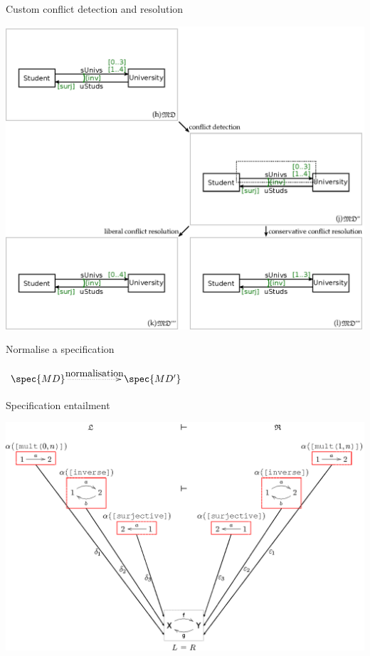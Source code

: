 \documentclass[dvips,slidetop,mathserif,brown]{beamer}
\begin{document}
\begin{frame}{Custom conflict detection and resolution}
  \begin{center}
    \includegraphics[scale=0.5]{ex_project_vc_custom_normalisation_md_md2_md3_1}
  \end{center}
\end{frame}

\begin{frame}{Normalise a specification}
  \begin{center}
    $\xymatrix{
      \spec{{MD}} \ar@{.>}[rr]^-{\txt{normalisation}} & & \spec{{MD'}}
    }$
  \end{center}
\end{frame}

\begin{frame}{Specification entailment}
  \begin{center}
    \includegraphics[width=\textwidth]{ex_spec_entailment}
  \end{center}
\end{frame}
\end{document}
